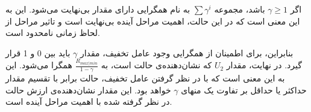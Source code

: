 اگر 
$\gamma \geq 1$
باشد، مجموعه
$\sum \gamma^i$
به نام همگرایی دارای مقدار بی‌نهایت می‌شود. این به این معنی است که در این حالت، اهمیت مراحل آینده بی‌نهایت است و تاثیر مراحل از لحاظ زمانی نامحدود است.

بنابراین، برای اطمینان از همگرایی وجود عامل تخفیف، مقدار 
$\gamma$
باید بین 0 و 1 قرار گیرد. در نهایت، مقدار 
$U_2$
که نشان‌دهنده‌ی
حالت است، به 
$\frac{R_{max|min}}{1-\gamma}$
همگرا می‌شود. این به این معنی است که با در نظر گرفتن عامل تخفیف،
حالت برابر با تقسیم مقدار حداکثر یا حداقل
بر تفاوت یک منهای 
$\gamma$
خواهد بود. این مقدار نشان‌دهنده‌ی ارزش حالت در نظر گرفته شده با اهمیت مراحل آینده است.


